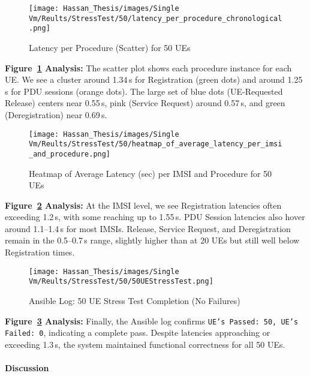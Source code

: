 \vspace{0.75em}
\begin{figure}[H]
    \centering
    \texttt{[image: Hassan\_Thesis/images/Single Vm/Reults/StressTest/50/latency\_per\_procedure\_chronological.png]}
    \caption{Latency per Procedure (Scatter) for 50 UEs}
    \label{fig:50ue-scatter-latency}
\end{figure}

\noindent
\textbf{Figure~\ref{fig:50ue-scatter-latency} Analysis:}  
The scatter plot shows each procedure instance for each UE. We see a cluster around 1.34\,s for Registration (green dots) and around 1.25\,s for PDU sessions (orange dots). The large set of blue dots (UE-Requested Release) centers near 0.55\,s, pink (Service Request) around 0.57\,s, and green (Deregistration) near 0.69\,s.

\vspace{0.75em}
\begin{figure}[H]
    \centering
    \texttt{[image: Hassan\_Thesis/images/Single Vm/Reults/StressTest/50/heatmap\_of\_average\_latency\_per\_imsi\_and\_procedure.png]}
    \caption{Heatmap of Average Latency (sec) per IMSI and Procedure for 50 UEs}
    \label{fig:50ue-heatmap-latency}
\end{figure}

\noindent
\textbf{Figure~\ref{fig:50ue-heatmap-latency} Analysis:}  
At the IMSI level, we see Registration latencies often exceeding 1.2\,s, with some reaching up to 1.55\,s. PDU Session latencies also hover around 1.1--1.4\,s for most IMSIs. Release, Service Request, and Deregistration remain in the 0.5--0.7\,s range, slightly higher than at 20 UEs but still well below Registration times.

\vspace{0.75em}
\begin{figure}[H]
    \centering
    \texttt{[image: Hassan\_Thesis/images/Single Vm/Reults/StressTest/50/50UEStressTest.png]}
    \caption{Ansible Log: 50 UE Stress Test Completion (No Failures)}
    \label{fig:50ue-ansible-output}
\end{figure}

\noindent
\textbf{Figure~\ref{fig:50ue-ansible-output} Analysis:}  
Finally, the Ansible log confirms \texttt{UE's Passed: 50, UE's Failed: 0}, indicating a complete pass. Despite latencies approaching or exceeding 1.3\,s, the system maintained functional correctness for all 50 UEs.

\paragraph{Discussion}

